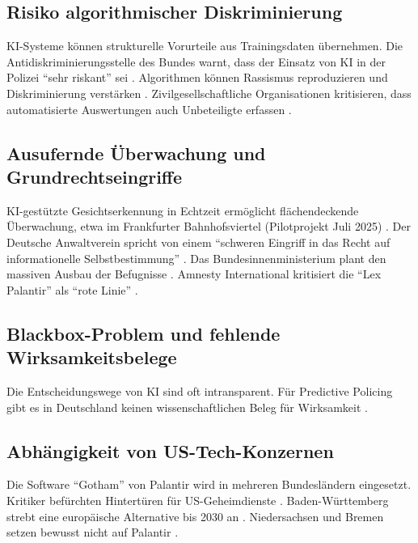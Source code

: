\documentclass[12pt,a4paper]{article}
\begin{document}
	\subsection{Risiko algorithmischer Diskriminierung}
	
	KI-Systeme können strukturelle Vorurteile aus Trainingsdaten übernehmen. Die Antidiskriminierungsstelle des Bundes warnt, dass der Einsatz von KI in der Polizei \enquote{sehr riskant} sei \cite{Antidisk2025}. Algorithmen können Rassismus reproduzieren und Diskriminierung verstärken \cite{taz2026}. Zivilgesellschaftliche Organisationen kritisieren, dass automatisierte Auswertungen auch Unbeteiligte erfassen \cite{Netzpolitik2025}.
	
	\subsection{Ausufernde Überwachung und Grundrechtseingriffe}
	
	KI-gestützte Gesichtserkennung in Echtzeit ermöglicht flächendeckende Überwachung, etwa im Frankfurter Bahnhofsviertel (Pilotprojekt Juli 2025) \cite{TOnline2025}. Der Deutsche Anwaltverein spricht von einem \enquote{schweren Eingriff in das Recht auf informationelle Selbstbestimmung} \cite{DAV2025}. Das Bundesinnenministerium plant den massiven Ausbau der Befugnisse \cite{DLF2025}. Amnesty International kritisiert die \enquote{Lex Palantir} als \enquote{rote Linie} \cite{Amnesty2026}.
	
	\subsection{Blackbox-Problem und fehlende Wirksamkeitsbelege}
	
	Die Entscheidungswege von KI sind oft intransparent. Für Predictive Policing gibt es in Deutschland keinen wissenschaftlichen Beleg für Wirksamkeit \cite{Peteranderl2025, CILIP2025}.
	
	\subsection{Abhängigkeit von US-Tech-Konzernen}
	
	Die Software \enquote{Gotham} von Palantir wird in mehreren Bundesländern eingesetzt. Kritiker befürchten Hintertüren für US-Geheimdienste \cite{Focus2025}. Baden-Württemberg strebt eine europäische Alternative bis 2030 an \cite{FR2026}. Niedersachsen und Bremen setzen bewusst nicht auf Palantir \cite{Goslarsche2025}.
	
\end{document}
